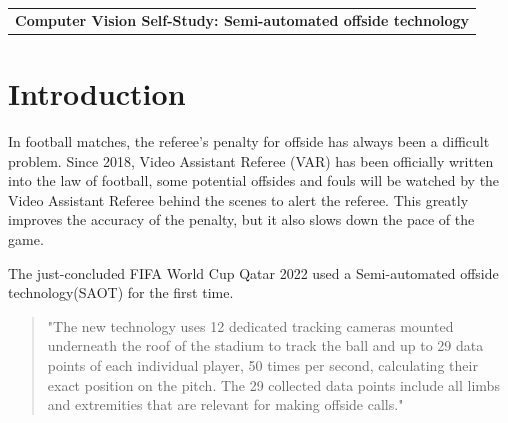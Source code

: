 \documentclass[12pt]{article}
\begin{document}
	\begin{center}
		\begin{tabular}{c}
			\textbf{Computer Vision Self-Study: Semi-automated offside technology} \\
		\end{tabular}
	\end{center}
	
	\section{Introduction}
		\indent In football matches, the referee's penalty for offside has always been a difficult problem. Since 2018, Video Assistant Referee (VAR) has been officially written into the law of football, some potential offsides and fouls will be watched by the Video Assistant Referee behind the scenes to alert the referee. This greatly improves the accuracy of the penalty, but it also slows down the pace of the game.
		
		The just-concluded FIFA World Cup Qatar 2022 used a Semi-automated offside technology(SAOT) for the first time.
		\begin{quote}
			"The new technology uses 12 dedicated tracking cameras mounted underneath the roof of the stadium to track the ball and up to 29 data points of each individual player, 50 times per second, calculating their exact position on the pitch. The 29 collected data points include all limbs and extremities that are relevant for making offside calls."\cite{fifa}
		\end{quote}
\end{document}
